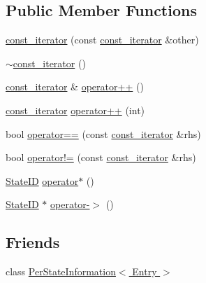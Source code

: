 \subsection*{Public Member Functions}
\begin{DoxyCompactItemize}
\item 
\hyperlink{classPerStateInformation_1_1const__iterator_a2f355ee663a5a209b5aea6741da55f19}{const\-\_\-iterator} (const \hyperlink{classPerStateInformation_1_1const__iterator}{const\-\_\-iterator} \&other)
\item 
\hyperlink{classPerStateInformation_1_1const__iterator_a21d459dce06190484592edc47b1d7d24}{$\sim$const\-\_\-iterator} ()
\item 
\hyperlink{classPerStateInformation_1_1const__iterator}{const\-\_\-iterator} \& \hyperlink{classPerStateInformation_1_1const__iterator_a5c83a66ca45a375b52360e2773ea575b}{operator++} ()
\item 
\hyperlink{classPerStateInformation_1_1const__iterator}{const\-\_\-iterator} \hyperlink{classPerStateInformation_1_1const__iterator_a07fb0708c40615406279fb7ca382f698}{operator++} (int)
\item 
bool \hyperlink{classPerStateInformation_1_1const__iterator_a9e09cdff82fb1b6b669cd28d6ec8bb14}{operator==} (const \hyperlink{classPerStateInformation_1_1const__iterator}{const\-\_\-iterator} \&rhs)
\item 
bool \hyperlink{classPerStateInformation_1_1const__iterator_a1973f2f89e030f6132ac4e09625d7518}{operator!=} (const \hyperlink{classPerStateInformation_1_1const__iterator}{const\-\_\-iterator} \&rhs)
\item 
\hyperlink{classStateID}{State\-I\-D} \hyperlink{classPerStateInformation_1_1const__iterator_a69921e1a8df8b883b87acc0f35a8f280}{operator$\ast$} ()
\item 
\hyperlink{classStateID}{State\-I\-D} $\ast$ \hyperlink{classPerStateInformation_1_1const__iterator_ae2fa5a43e634d0036e97424bad5c1f18}{operator-\/$>$} ()
\end{DoxyCompactItemize}
\subsection*{Friends}
\begin{DoxyCompactItemize}
\item 
class \hyperlink{classPerStateInformation_1_1const__iterator_ae69462da21a4e3a3b602a69ebc4738c1}{Per\-State\-Information$<$ Entry $>$}
\end{DoxyCompactItemize}


